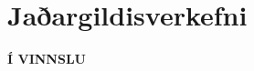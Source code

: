 \documentclass[A4paper,10pt,icelandic]{sphinxmanual}
\begin{document}
 \chapter{Jaðargildisverkefni}
 \textbf{Í VINNSLU}
% 
% 
% 
\end{document}
